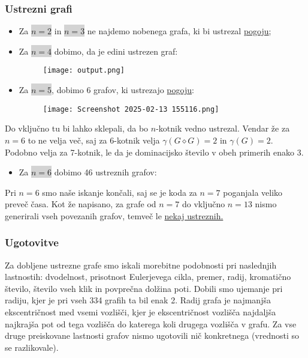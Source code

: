 \documentclass[a4paper,12pt]{article}
\theoremstyle{definition}
\begin{document}

\subsubsection{Ustrezni grafi}

\begin{itemize}
    \item Za \colorbox{lightgray}{$ n = 2 $} in \colorbox{lightgray}{$ n = 3 $} ne najdemo nobenega grafa, ki bi ustrezal \hyperref[nov_pogoj]{pogoju};
    \item Za \colorbox{lightgray}{$ n = 4 $} dobimo, da je edini ustrezen graf:
    \begin{figure}[H]
        \centering
        \texttt{[image: output.png]}
    \end{figure}
    \item Za \colorbox{lightgray}{$ n = 5 $}, dobimo 6 grafov, ki ustrezajo \hyperref[nov_pogoj]{pogoju}:
    \begin{figure}[H]
        \centering
        \texttt{[image: Screenshot 2025-02-13 155116.png]}
    \end{figure}
    \end{itemize}
    
    \noindent Do vključno tu bi lahko sklepali, da bo $n$-kotnik vedno ustrezal. Vendar že za $n = 6$ to ne velja več, saj za 6-kotnik velja $\gamma(G \diamond G) = 2$ in $\gamma(G) = 2$. Podobno velja za 7-kotnik, le da je dominacijsko število v obeh primerih enako 3.
\begin{itemize}
    \item Za \colorbox{lightgray}{$ n = 6 $} dobimo 46 ustreznih grafov:
     
\end{itemize}

\noindent Pri $n = 6$ smo naše iskanje končali, saj se je koda za $n = 7$ poganjala veliko preveč časa. Kot že napisano, za grafe od $n = 7$ do vključno $n = 13$ nismo generirali vseh povezanih grafov, temveč le \hyperref[ne_vsi_povezani]{nekaj ustreznih.}

\subsubsection{Ugotovitve}
\noindent Za dobljene ustrezne grafe smo iskali morebitne podobnosti pri naslednjih lastnostih: dvodelnost, prisotnost Eulerjevega cikla, premer, radij, kromatično število, število vseh klik in povprečna dolžina poti. Dobili smo ujemanje pri radiju, kjer je pri vseh 334 grafih ta bil enak 2. Radij grafa je najmanjša ekscentričnost med vsemi vozlišči, kjer je ekscentričnost vozlišča najdaljša najkrajša pot od tega vozlišča do katerega koli drugega vozlišča v grafu. Za vse druge preiskovane lastnosti grafov nismo ugotovili nič konkretnega (vrednosti so se razlikovale).
\end{document}

